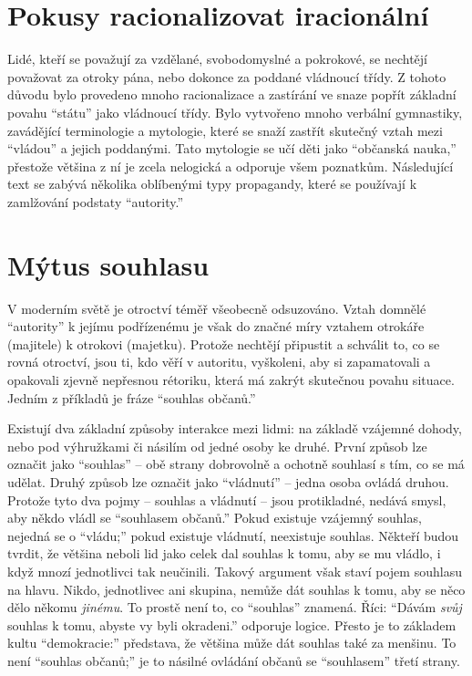 \documentclass{book}
\begin{document}
\section{Pokusy racionalizovat iracionální}

Lidé, kteří se považují za vzdělané, svobodomyslné a pokrokové, se nechtějí považovat za otroky pána, nebo dokonce za poddané vládnoucí třídy. Z tohoto důvodu bylo provedeno mnoho racionalizace a zastírání ve snaze popřít základní povahu \enquote{státu} jako vládnoucí třídy. Bylo vytvořeno mnoho verbální gymnastiky, zavádějící terminologie a mytologie, které se snaží zastřít skutečný vztah mezi \enquote{vládou} a jejich poddanými. Tato mytologie se učí děti jako \enquote{občanská nauka,} přestože většina z ní je zcela nelogická a odporuje všem poznatkům. Následující text se zabývá několika oblíbenými typy propagandy, které se používají k zamlžování podstaty \enquote{autority.}

\section{Mýtus souhlasu}

V moderním světě je otroctví téměř všeobecně odsuzováno. Vztah domnělé \enquote{autority} k jejímu podřízenému je však do značné míry vztahem otrokáře (majitele) k otrokovi (majetku). Protože nechtějí připustit a schválit to, co se rovná otroctví, jsou ti, kdo věří v autoritu, vyškoleni, aby si zapamatovali a opakovali zjevně nepřesnou rétoriku, která má zakrýt skutečnou povahu situace. Jedním z příkladů je fráze \enquote{souhlas občanů.}

Existují dva základní způsoby interakce mezi lidmi: na základě vzájemné dohody, nebo pod výhružkami či násilím od jedné osoby ke druhé. První způsob lze označit jako \enquote{souhlas} -- obě strany dobrovolně a ochotně souhlasí s tím, co se má udělat. Druhý způsob lze označit jako \enquote{vládnutí} -- jedna osoba ovládá druhou. Protože tyto dva pojmy -- souhlas a vládnutí -- jsou protikladné, nedává smysl, aby někdo vládl se \enquote{souhlasem občanů.} Pokud existuje vzájemný souhlas, nejedná se o \enquote{vládu;} pokud existuje vládnutí, neexistuje souhlas. Někteří budou tvrdit, že většina neboli lid jako celek dal souhlas k tomu, aby se mu vládlo, i když mnozí jednotlivci tak neučinili. Takový argument však staví pojem souhlasu na hlavu. Nikdo, jednotlivec ani skupina, nemůže dát souhlas k tomu, aby se něco dělo někomu \emph{jinému}. To prostě není to, co \enquote{souhlas} znamená. Říci: \enquote{Dávám \emph{svůj} souhlas k tomu, abyste vy byli okradeni.} odporuje logice. Přesto je to základem kultu \enquote{demokracie:} představa, že většina může dát souhlas také za menšinu. To není \enquote{souhlas občanů;} je to násilné ovládání občanů se \enquote{souhlasem} třetí strany.
\end{document}
